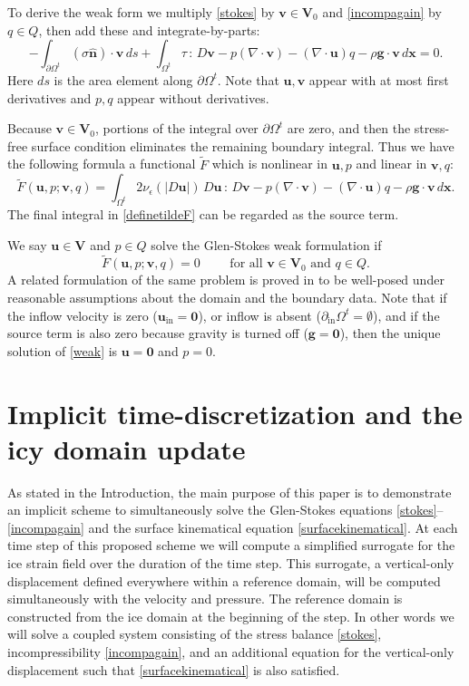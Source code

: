 \documentclass[letterpaper,final,12pt,reqno]{amsart}
\newcommand{\eps}{\epsilon}
\newcommand{\hbn}{\hat{\mathbf{n}}}
\newcommand{\bg}{\mathbf{g}}
\newcommand{\bu}{\mathbf{u}}
\newcommand{\bv}{\mathbf{v}}
\newcommand{\bx}{\mathbf{x}}
\newcommand{\bV}{\mathbf{V}}
\newcommand{\bzero}{\bm{0}}
\begin{document}
To derive the weak form we multiply \eqref{stokes} by $\bv\in \bV_0$ and \eqref{incompagain} by $q\in Q$, then add these and integrate-by-parts:
\begin{equation}
-\int_{\partial\Omega^t} (\sigma \hbn)\cdot \bv\,ds + \int_{\Omega^t} \tau \,:\,D\bv - p (\nabla \cdot \bv) - \left(\nabla \cdot \bu\right) q - \rho \mathbf{g} \cdot \bv \,d\bx = 0. \label{nonfunctwo}
\end{equation}
Here $ds$ is the area element along $\partial\Omega^t$.  Note that $\bu,\bv$ appear with at most first derivatives and $p,q$ appear without derivatives.

Because $\bv\in \bV_0$, portions of the integral over $\partial\Omega^t$ are zero, and then the stress-free surface condition eliminates the remaining boundary integral.  Thus we have the following formula a functional $\tilde F$ which is nonlinear in $\bu,p$ and linear in $\bv,q$:
\begin{equation}
\tilde F(\bu,p;\bv,q) = \int_{\Omega^t} 2 \nu_\eps(|D\bu|)\, D\bu\,:\,D\bv - p (\nabla \cdot \bv) - \left(\nabla \cdot \bu\right) q - \rho \mathbf{g} \cdot \bv \,d\bx. \label{definetildeF}
\end{equation}
The final integral in \eqref{definetildeF} can be regarded as the source term.

We say $\bu\in \bV$ and $p\in Q$ solve the Glen-Stokes weak formulation if
\begin{equation}
\tilde F(\bu,p;\bv,q) = 0 \qquad \text{ for all } \bv\in \bV_0 \text{ and } q\in Q.  \label{weak}
\end{equation}
A related formulation of the same problem is proved in \cite[Theorem 3.8]{JouvetRappaz2011} to be well-posed under reasonable assumptions about the domain and the boundary data.  Note that if the inflow velocity is zero ($\bu_{\text{in}}=\bzero$), or inflow is absent ($\partial_{\text{in}} \Omega^t = \emptyset$), and if the source term is also zero because gravity is turned off ($\bg=\bzero$), then the unique solution of \eqref{weak} is $\bu=\bzero$ and $p=0$.


\section{Implicit time-discretization and the icy domain update} \label{sec:implicitstep}

As stated in the Introduction, the main purpose of this paper is to demonstrate an implicit scheme to simultaneously solve the Glen-Stokes equations \eqref{stokes}--\eqref{incompagain} and the surface kinematical equation \eqref{surfacekinematical}.  At each time step of this proposed scheme we will compute a simplified surrogate for the ice strain field over the duration of the time step.  This surrogate, a vertical-only displacement defined everywhere within a reference domain, will be computed simultaneously with the velocity and pressure.  The reference domain is constructed from the ice domain at the beginning of the step.  In other words we will solve a coupled system consisting of the stress balance \eqref{stokes}, incompressibility \eqref{incompagain}, and an additional equation for the vertical-only displacement such that \eqref{surfacekinematical} is also satisfied.
\end{document}
